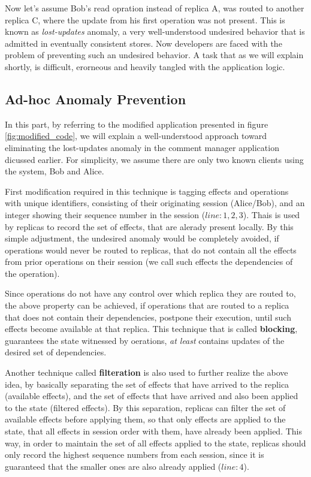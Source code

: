 Now let's assume Bob's read opration instead of replica A, was routed
to another replica C, where the update from his first operation was not
present. This is known as \emph{lost-updates} anomaly, a very
well-understood
undesired behavior that is admitted in eventually consistent stores. 
Now developers are faced with the problem of preventing such an undesired
behavior. A task that as we will explain shortly, is difficult,
erorneous and heavily tangled with the application logic.
%
%
\subsection{Ad-hoc Anomaly Prevention}
In this part, by referring to the modified application  presented in figure
\ref{fig:modified_code}, we will
explain a well-understood approach toward eliminating the lost-updates anomaly in
the  comment manager application dicussed earlier. For simplicity, we
assume there are only two known clients using the system, Bob and Alice.

First modification required in this technique is tagging effects and
operations with
unique identifiers, consisting of their originating session (Alice/Bob),
and an integer showing their
sequence number in the session ($line:1,2,3$). Thais is used by replicas to
record the set of effects, that are alerady present locally.
By this simple adjustment, the undesired anomaly would
be completely avoided, if operations would never be routed to replicas,
that do not contain all the effects from prior operations on their
session (we call such effects the dependencies of
the operation). 

Since operations do not have any control over which replica they are
routed to, the above property can be achieved, if operations that are
routed to a replica that does not contain their dependencies, postpone
their execution, until such effects become available at that replica.
This technique that is called {\bf blocking}, guarantees the state
witnessed by oerations, \emph{at least} contains updates of the desired set
of dependencies.

Another technique called {\bf filteration} is also used to further realize
the above idea, by basically separating the set of effects that have
arrived to the replica (available effects), and the set of effects that have
arrived and also been applied to the state (filtered effects).
By this separation, replicas can filter the set of available effects before
applying them, so that only effects are applied to the state, that all
effects in session order with them, have already been applied.
This way, in order to maintain the set of all effects applied to the state, 
replicas should only  record the highest sequence
numbers from each session, since it
is guaranteed that the smaller ones are also already applied ($line:4$). 

